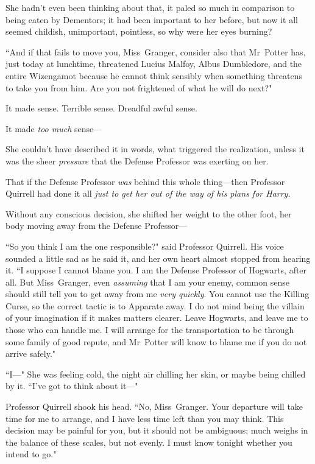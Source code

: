 She hadn't even been thinking about that, it paled so much in comparison to being eaten by Dementors; it had been important to her before, but now it all seemed childish, unimportant, pointless, so why were her eyes burning?

``And if that fails to move you, Miss~Granger, consider also that Mr~Potter has, just today at lunchtime, threatened Lucius Malfoy, Albus Dumbledore, and the entire Wizengamot because he cannot think sensibly when something threatens to take you from him. Are you not frightened of what he will do next?"

It made sense. Terrible sense. Dreadful awful sense.

It made \emph{too much} sense—

She couldn't have described it in words, what triggered the realization, unless it was the sheer \emph{pressure} that the Defense Professor was exerting on her.

That if the Defense Professor \emph{was} behind this whole thing—then Professor Quirrell had done it all \emph{just to get her out of the way of his plans for Harry.}

Without any conscious decision, she shifted her weight to the other foot, her body moving away from the Defense Professor—

``So you think I am the one responsible?" said Professor Quirrell. His voice sounded a little sad as he said it, and her own heart almost stopped from hearing it. ``I suppose I cannot blame you. I am the Defense Professor of Hogwarts, after all. But Miss~Granger, even \emph{assuming} that I am your enemy, common sense should still tell you to get away from me \emph{very quickly}. You cannot use the Killing Curse, so the correct tactic is to Apparate away. I do not mind being the villain of your imagination if it makes matters clearer. Leave Hogwarts, and leave me to those who can handle me. I will arrange for the transportation to be through some family of good repute, and Mr~Potter will know to blame me if you do not arrive safely."

``I—" She was feeling cold, the night air chilling her skin, or maybe being chilled by it. ``I've got to think about it—"

Professor Quirrell shook his head. ``No, Miss~Granger. Your departure will take time for me to arrange, and I have less time left than you may think. This decision may be painful for you, but it should not be ambiguous; much weighs in the balance of these scales, but not evenly. I must know tonight whether you intend to go."

